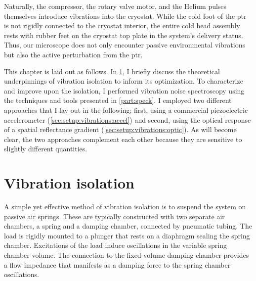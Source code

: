 Naturally, the compressor, the rotary valve motor, and the Helium pulses themselves introduce vibrations into the cryostat.
While the cold foot of the \gls{ptr} is not rigidly connected to the cryostat interior,
the entire cold head assembly rests with rubber feet on the cryostat top plate in the system's delivery status.
Thus, our microscope does not only encounter passive environmental vibrations but also the active perturbation from the \gls{ptr}.

\cite{Caparrelli2006,Pelliccione2013}

This chapter is laid out as follows.
In \cref{sec:setup:vibrations:isolation}, I briefly discuss the theoretical underpinnings of vibration isolation to inform its optimization.
To characterize and improve upon the isolation, I performed vibration noise spectroscopy using the techniques and tools presented in \cref{part:speck}.
I employed two different approaches that I lay out in the following; first, using a commercial piezoelectric accelerometer (\cref{sec:setup:vibrations:accel}) and second, using the optical response of a spatial reflectance gradient (\cref{sec:setup:vibrations:optic}).
As will become clear, the two approaches complement each other because they are sensitive to slightly different quantities.

\section{Vibration isolation}\label{sec:setup:vibrations:isolation}
A simple yet effective method of vibration isolation is to suspend the system on passive air springs.
These are typically constructed with two separate air chambers, a spring and a damping chamber, connected by pneumatic tubing.
The load is rigidly mounted to a plunger that rests on a diaphragm sealing the spring chamber.
Excitations of the load induce oscillations in the variable spring chamber volume.
The connection to the fixed-volume damping chamber provides a flow impedance
that manifests as a damping force to the spring chamber oscillations.

